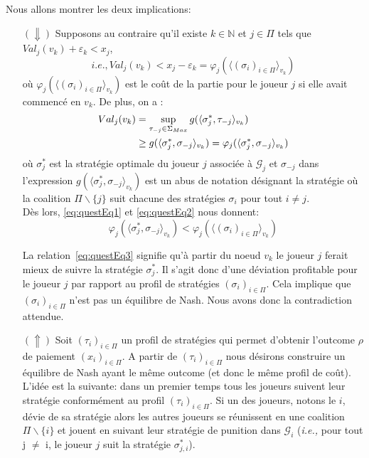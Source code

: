 \begin{demonstration}
	Nous allons montrer les deux implications:\\
	\begin{itemize}
		\item[$(\Downarrow)$] Supposons au contraire qu'il existe $k\in \mathbb{N}$ et $j\in\Pi$ tels que $Val_j(v_k) + \varepsilon_k < x_j$,
		\begin{equation}
			\label{eq:questEq1}
			i.e., Val_j(v_k) < x_j - \varepsilon_k = \varphi_j(\langle (\sigma_i)_{i \in \Pi}\rangle_{v_k})
		\end{equation}
		où $\varphi_j(\langle (\sigma_i)_{i \in \Pi}\rangle_{v_k})$ est le coût de la partie pour le joueur $j$ si elle avait commencé en $v_k$.
		De plus, on a : 
		\begin{align}
			\label{eq:questEq2}
			Val_j(v_k) &= \sup_{\tau_{-j}\in \Sigma_{Max}} g(\langle \sigma^*_j,\tau_{-j} \rangle_{v_k}) \notag\\
			           &\geq g (\langle \sigma^*_j,\sigma_{-j} \rangle_{v_k}) = \varphi_j(\langle \sigma^*_j,\sigma_{-j} \rangle_{v_k})
		\end{align}
		où $\sigma^*_j$ est la stratégie optimale du joueur $j$ associée à $\mathcal{G}_j$ et $\sigma_{-j}$ dans l'expression $g (\langle \sigma^*_j,\sigma_{-j} \rangle_{v_k})$ est un abus de notation désignant la stratégie où la coalition $\Pi\backslash\{ j \}$ suit chacune des stratégies $\sigma_i$ pour tout $i \neq j$.\\
		
		Dès lors, \eqref{eq:questEq1} et \eqref{eq:questEq2} nous donnent:
		\begin{equation}
			\label{eq:questEq3}
			\varphi_j(\langle \sigma^*_j,\sigma_{-j} \rangle_{v_k}) < \varphi_j(\langle(\sigma_i)_{i\in \Pi}\rangle_{v_k})
		\end{equation}
		
		La relation~\eqref{eq:questEq3} signifie qu'à partir du noeud $v_k$ le joueur $j$ ferait mieux de suivre la stratégie $\sigma^*_j$. Il s'agit donc d'une déviation profitable pour le joueur $j$ par rapport au profil de stratégies $(\sigma_i)_{i\in \Pi}$. Cela implique que $(\sigma_i)_{i\in\Pi}$ n'est pas un équilibre de Nash. Nous avons donc la contradiction attendue.\\
		
		\item[$(\Uparrow)$] Soit $(\tau_i)_{i\in \Pi}$ un profil de stratégies qui permet d'obtenir l'outcome $\rho$ de paiement $(x_i)_{i\in\Pi}$.
		A partir de $(\tau_i)_{i\in \Pi}$ nous désirons construire un équilibre de Nash ayant le même outcome (et donc le même profil de coût).
		L'idée est la suivante: dans un premier temps tous les joueurs suivent leur stratégie conformément au profil $(\tau_i)_{i \in \Pi}$. Si un des joueurs, notons le $i$,  dévie de sa stratégie alors les autres joueurs se réunissent en une coalition $\Pi\backslash \{ i \}$ et jouent en suivant leur stratégie de punition dans $\mathcal{G}_i$ (\emph{i.e.,} pour tout j $\neq$ i, le joueur $j$ suit la stratégie $\sigma^*_{j,i}$).\\
		

\end{itemize}
\end{demonstration}
